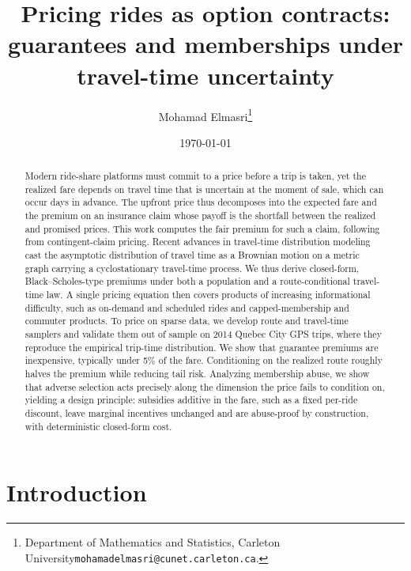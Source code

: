 \documentclass[12pt]{article}
\begin{document}
\title{Pricing rides as option contracts: guarantees and memberships under travel-time uncertainty}

\author{Mohamad Elmasri\thanks{Department of Mathematics and Statistics, Carleton University\texttt{mohamadelmasri@cunet.carleton.ca}.}}
\date{\today}
\maketitle
\tableofcontents

\vspace{-0.25in}
\begin{abstract}
Modern ride-share platforms must commit to a price before a trip is taken, yet the realized fare depends on travel time that is uncertain at the moment of sale, which can occur days in advance. The upfront price thus decomposes into the expected fare and the premium on an insurance claim whose payoff is the shortfall between the realized and promised prices. This work computes the fair premium for such a claim, following from contingent-claim pricing. Recent advances in travel-time distribution modeling cast the asymptotic distribution of travel time as a Brownian motion on a metric graph carrying a cyclostationary travel-time process. We thus derive closed-form, Black–Scholes-type premiums under both a population and a route-conditional travel-time law. A single pricing equation then covers products of increasing informational difficulty, such as on-demand and scheduled rides and capped-membership and commuter products. To price on sparse data, we develop route and travel-time samplers and validate them out of sample on 2014 Quebec City GPS trips, where they reproduce the empirical trip-time distribution. We show that guarantee premiums are inexpensive, typically under 5\% of the fare. Conditioning on the realized route roughly halves the premium while reducing tail risk. Analyzing membership abuse, we show that adverse selection acts precisely along the dimension the price fails to condition on, yielding a design principle: subsidies additive in the fare, such as a fixed per-ride discount, leave marginal incentives unchanged and are abuse-proof by construction, with deterministic closed-form cost.

\end{abstract}
\section{Introduction}\label{sec:introduction}
\end{document}
